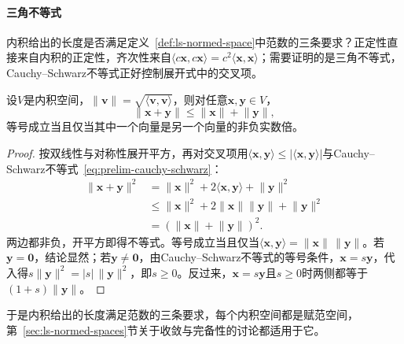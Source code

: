 \paragraph{三角不等式}
内积给出的长度是否满足定义~\ref{def:ls-normed-space}中范数的三条要求？正定性直接来自内积的正定性，齐次性来自$\langle c\bm x,c\bm x\rangle=c^2\langle\bm x,\bm x\rangle$；需要证明的是三角不等式，Cauchy--Schwarz不等式正好控制展开式中的交叉项。
\begin{theorem}[内积诱导长度的三角不等式]
\label{thm:ls-inner-product-triangle}
设$V$是内积空间，$\lVert\bm v\rVert=\sqrt{\langle\bm v,\bm v\rangle}$，则对任意$\bm x,\bm y\in V$，
\[
 \lVert\bm x+\bm y\rVert\leq\lVert\bm x\rVert+\lVert\bm y\rVert,
\]
等号成立当且仅当其中一个向量是另一个向量的非负实数倍。
\end{theorem}
\begin{proof}
按双线性与对称性展开平方，再对交叉项用$\langle\bm x,\bm y\rangle\leq|\langle\bm x,\bm y\rangle|$与Cauchy--Schwarz不等式~\eqref{eq:prelim-cauchy-schwarz}：
\[
 \begin{aligned}
 \lVert\bm x+\bm y\rVert^2
 &=\lVert\bm x\rVert^2+2\langle\bm x,\bm y\rangle+\lVert\bm y\rVert^2\\
 &\leq\lVert\bm x\rVert^2+2\lVert\bm x\rVert\lVert\bm y\rVert+\lVert\bm y\rVert^2\\
 &=(\lVert\bm x\rVert+\lVert\bm y\rVert)^2.
 \end{aligned}
\]
两边都非负，开平方即得不等式。等号成立当且仅当$\langle\bm x,\bm y\rangle=\lVert\bm x\rVert\,\lVert\bm y\rVert$。若$\bm y=\bm0$，结论显然；若$\bm y\neq\bm0$，由Cauchy--Schwarz不等式的等号条件，$\bm x=s\bm y$，代入得$s\lVert\bm y\rVert^2=|s|\,\lVert\bm y\rVert^2$，即$s\geq0$。反过来，$\bm x=s\bm y$且$s\geq0$时两侧都等于$(1+s)\lVert\bm y\rVert$。
\end{proof}
于是内积给出的长度满足范数的三条要求，每个内积空间都是赋范空间，第~\ref{sec:ls-normed-spaces}节关于收敛与完备性的讨论都适用于它。

